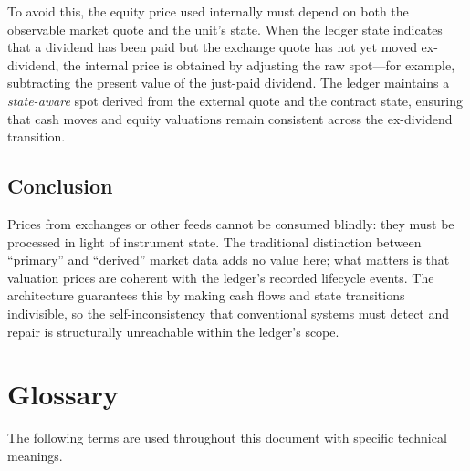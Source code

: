 \documentclass[11pt,a4paper]{article}
\begin{document}
To avoid this, the equity price used internally must depend on both the observable market quote and the unit's state. When the ledger state indicates that a dividend has been paid but the exchange quote has not yet moved ex-dividend, the internal price is obtained by adjusting the raw spot---for example, subtracting the present value of the just-paid dividend. The ledger maintains a \textit{state-aware} spot derived from the external quote and the contract state, ensuring that cash moves and equity valuations remain consistent across the ex-dividend transition.

\subsection{Conclusion}

Prices from exchanges or other feeds cannot be consumed blindly: they must be processed in light of instrument state. The traditional distinction between ``primary'' and ``derived'' market data adds no value here; what matters is that valuation prices are coherent with the ledger's recorded lifecycle events. The architecture guarantees this by making cash flows and state transitions indivisible, so the self-inconsistency that conventional systems must detect and repair is structurally unreachable within the ledger's scope.

\section{Glossary}
\label{app:glossary}

The following terms are used throughout this document with specific technical meanings.
\end{document}
